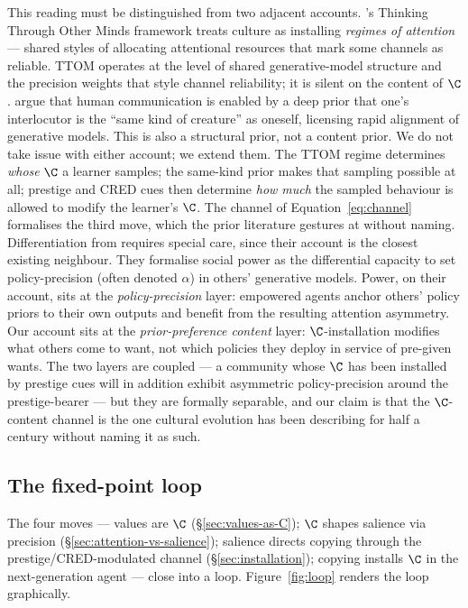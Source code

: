 This reading must be distinguished from two adjacent accounts.
\citet{veissiere2020TTOM}'s Thinking Through Other Minds framework treats
culture as installing \emph{regimes of attention} --- shared styles of
allocating attentional resources that mark some channels as reliable. TTOM
operates at the level of shared generative-model structure and the precision
weights that style channel reliability; it is silent on the content of $\C$.
\citet{vasil2020SameKind} argue that human communication is enabled by a
deep prior that one's interlocutor is the ``same kind of creature'' as
oneself, licensing rapid alignment of generative models. This is also a
structural prior, not a content prior. We do not take issue with either
account; we extend them. The TTOM regime determines \emph{whose} $\C$ a
learner samples; the same-kind prior makes that sampling possible at all;
prestige and CRED cues then determine \emph{how much} the sampled
behaviour is allowed to modify the learner's $\C$. The channel of
Equation~\eqref{eq:channel} formalises the third move, which the prior
literature gestures at without naming. Differentiation from
\citet{albarracin2025SocialPower} requires special care, since their account
is the closest existing neighbour. They formalise social power as the
differential capacity to set policy-precision (often denoted $\alpha$) in
others' generative models. Power, on their account, sits at the
\emph{policy-precision} layer: empowered agents anchor others' policy priors
to their own outputs and benefit from the resulting attention asymmetry. Our
account sits at the \emph{prior-preference content} layer:
$\C$-installation modifies what others come to want, not which policies they
deploy in service of pre-given wants. The two layers are coupled --- a
community whose $\C$ has been installed by prestige cues will in addition
exhibit asymmetric policy-precision around the prestige-bearer --- but they
are formally separable, and our claim is that the $\C$-content channel is
the one cultural evolution has been describing for half a century without
naming it as such.

\subsection{The fixed-point loop}
\label{sec:loop}

The four moves --- values are $\C$ (\S\ref{sec:values-as-C}); $\C$ shapes
salience via precision (\S\ref{sec:attention-vs-salience}); salience directs
copying through the prestige/CRED-modulated channel (\S\ref{sec:installation});
copying installs $\C$ in the next-generation agent --- close into a loop.
Figure~\ref{fig:loop} renders the loop graphically.

